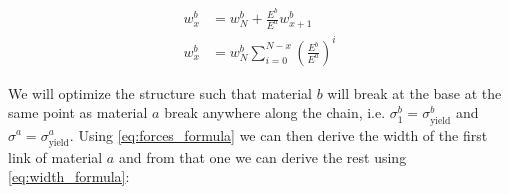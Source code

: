 \begin{align}
	w_{x}^b &= w_N^b + \frac{E^b}{E^a} w^b_{x+1} \\
	w^b_{x} &= w^b_N \sum\limits_{i=0}^{N-x} \left(\frac{E^b}{E^a}\right)^i \label{eq:widths_b}
\end{align}

We will optimize the structure such that material $b$ will break at the base at the same point as material $a$ break anywhere along the chain, i.e. $\sigma^b_1 = \sigma^b_\text{yield}$ and $\sigma^a  = \sigma^a_\text{yield}$.
Using \cref{eq:forces_formula} we can then derive the width of the first link of material $a$ and from that one we can derive the rest using \cref{eq:width_formula}:

